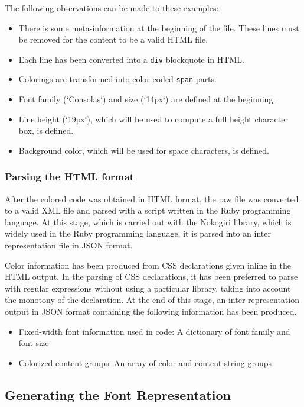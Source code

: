 \documentclass{article}
\begin{document}
The following observations can be made to these examples:

\begin{itemize}
\item There is some meta-information at the beginning of the file. These lines must be removed for the content to be a valid HTML file.
\item Each line has been converted into a \texttt{div} blockquote in HTML.
\item Colorings are transformed into color-coded \texttt{span} parts.
\item Font family (`Consolas`) and size (`14px`) are defined at the beginning.
\item Line height (`19px`), which will be used to compute a full height character box, is defined.
\item Background color, which will be used for space characters, is defined.
\end{itemize}

\subsubsection{Parsing the HTML format}

After the colored code was obtained in HTML format, the raw file was converted to a valid XML file and parsed with a script written in the Ruby programming language. At this stage, which is carried out with the Nokogiri library\cite{nokogiri2022package}, which is widely used in the Ruby programming language, it is parsed into an inter representation file in JSON format.

Color information has been produced from CSS declarations given inline in the HTML output. In the parsing of CSS declarations, it has been preferred to parse with regular expressions without using a particular library, taking into account the monotony of the declaration. At the end of this stage, an inter representation output in JSON format containing the following information has been produced.

\begin{itemize}
  \item Fixed-width font information used in code: A dictionary of font family and font size
  \item Colorized content groups: An array of color and content string groups
\end{itemize}

\subsection{Generating the Font Representation}
\end{document}
